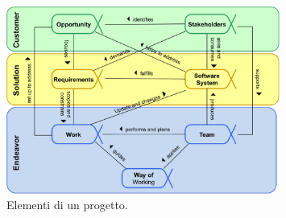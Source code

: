 		\begin{figure}[H]
			\centering
			\includegraphics[width=0.8\textwidth]{img/prog}
			\caption{Elementi di un progetto.}
			\label{cardsemat}
		\end{figure}


		\begin{figure}[H]
			\centering
			\qquad
			\label{customerimage}
		\end{figure}

